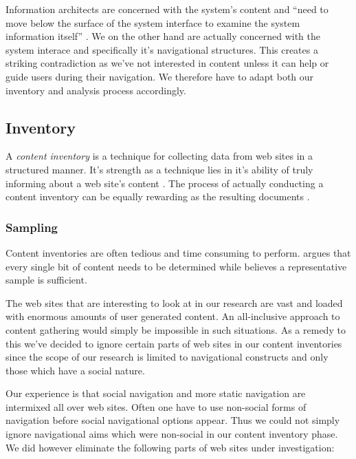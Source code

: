 Information architects are concerned with
the system's content and ``need to move below the surface of the system
interface to examine the system information itself'' \citep[p.~94]{batley07}.
We on the other hand are actually concerned with the system interace and
specifically it's navigational structures. This creates a striking
contradiction as we've not interested in content unless it can help or
guide users during their navigation. We therefore have to adapt
both our inventory and analysis process accordingly.

\subsection{Inventory}

A \emph{content inventory} is a technique for collecting data from web sites
in a structured manner. It's strength as a technique lies in it's ability of
truly informing about a web site's content \citep{wodtke02}. The process of
actually conducting a content inventory can be equally rewarding as the
resulting documents \citep{veen02}.

\subsubsection{Sampling}
\label{section:methodology.content.analysis.sampling}

Content inventories are often tedious and time consuming to perform.
\citet[p.~267]{wodtke02} argues that every single bit of content needs to be
determined while \citet[p.~241]{morville06} believes a representative sample
is sufficient.

The web sites that are interesting to look at in our research are vast and
loaded with enormous amounts of user generated content. An all-inclusive
approach to content gathering would simply be impossible in such situations.
As a remedy to this we've decided to ignore certain parts of web sites in our
content inventories since the scope of our research is limited to navigational
constructs and only those which have a social nature.

Our experience is that social navigation and more static navigation are
intermixed all over web sites. Often one have to use non-social forms of
navigation before social navigational options appear. Thus we could not simply
ignore navigational aims which were non-social in our content inventory phase.
We did however eliminate the following parts of web sites under investigation:

